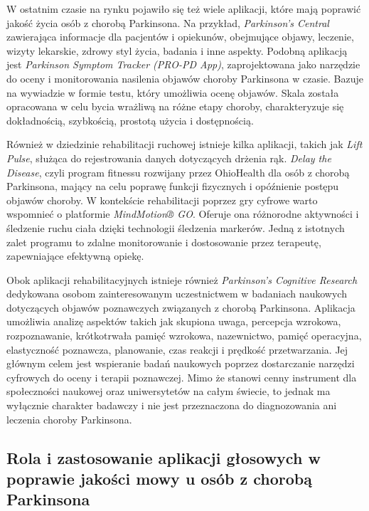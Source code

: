 W ostatnim czasie na rynku pojawiło się też wiele aplikacji, które mają poprawić jakość życia osób z chorobą Parkinsona.
Na przykład, \emph{Parkinson's Central} zawierająca informacje dla pacjentów i opiekunów, obejmujące objawy, leczenie, wizyty lekarskie, zdrowy styl życia, badania i inne aspekty.
Podobną aplikacją jest \emph{Parkinson Symptom Tracker (PRO-PD App)}, zaprojektowana jako narzędzie do oceny i monitorowania nasilenia objawów choroby Parkinsona w czasie.
Bazuje na wywiadzie w formie testu, który umożliwia ocenę objawów.
Skala została opracowana w celu bycia wrażliwą na różne etapy choroby, charakteryzuje się dokładnością, szybkością, prostotą użycia i dostępnością.

Również w dziedzinie rehabilitacji ruchowej istnieje kilka aplikacji, takich jak \emph{Lift Pulse}, służąca do rejestrowania danych dotyczących drżenia rąk.
\emph{Delay the Disease}, czyli program fitnessu rozwijany przez OhioHealth dla osób z chorobą Parkinsona, mający na celu poprawę funkcji fizycznych i opóźnienie postępu objawów choroby.
W kontekście rehabilitacji poprzez gry cyfrowe warto wspomnieć o platformie \emph{MindMotion® GO}.
Oferuje ona różnorodne aktywności i śledzenie ruchu ciała dzięki technologii śledzenia markerów.
Jedną z istotnych zalet programu to zdalne monitorowanie i dostosowanie przez terapeutę, zapewniające efektywną opiekę.

Obok aplikacji rehabilitacyjnych istnieje również \emph{Parkinson's Cognitive Research} dedykowana osobom zainteresowanym uczestnictwem w badaniach
naukowych dotyczących objawów poznawczych związanych z chorobą Parkinsona.
Aplikacja umożliwia analizę aspektów takich jak skupiona uwaga, percepcja wzrokowa, rozpoznawanie,
krótkotrwała pamięć wzrokowa, nazewnictwo, pamięć operacyjna, elastyczność poznawcza, planowanie, czas reakcji i prędkość przetwarzania.
Jej głównym celem jest wspieranie badań naukowych poprzez dostarczanie narzędzi cyfrowych do oceny i terapii poznawczej.
Mimo że stanowi cenny instrument dla społeczności naukowej oraz uniwersytetów na całym świecie, to jednak ma wyłącznie charakter badawczy i nie jest przeznaczona do diagnozowania ani leczenia choroby Parkinsona.

\subsection{Rola i zastosowanie aplikacji głosowych w poprawie jakości mowy u osób z chorobą Parkinsona}
\label{subsec:aplikacje-glosowe}

